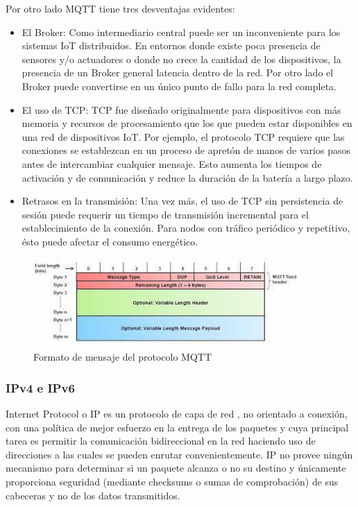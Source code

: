 Por otro lado MQTT tiene tres desventajas evidentes:
\begin{itemize}
\item El Broker: Como intermediario central puede ser un inconveniente para los sistemas IoT distribuidos. En entornos donde existe poca presencia de sensores y/o actuadores o donde no crece la cantidad de los dispositivos, la presencia de un Broker general latencia dentro de la red. Por otro lado el Broker puede convertirse en un único punto de fallo para la red completa.
\item El uso de TCP: TCP fue diseñado originalmente para dispositivos con más memoria y recursos de procesamiento que los que pueden estar disponibles en una red de dispositivos IoT. Por ejemplo, el protocolo TCP requiere que las conexiones se establezcan en un proceso de apretón de manos de varios pasos antes de intercambiar cualquier mensaje. Esto aumenta los tiempos de activación y de comunicación y reduce la duración de la batería a largo plazo.
\item Retrasos en la transmisión: Una vez más, el uso de TCP sin persistencia de sesión puede requerir un tiempo de transmisión incremental para el establecimiento de la conexión. Para nodos con tráfico periódico y repetitivo, ésto puede afectar el consumo energético.
\end{itemize}

\begin{figure}[ht]
\centering
\includegraphics[width=0.9\textwidth]{./Figuras/mqtt_header.jpeg}
\caption{\label{fig:mqttheader}Formato de mensaje del protocolo MQTT}
\vspace*{-10pt}
\end{figure}


\subsubsection{IPv4 e IPv6}
Internet Protocol o IP es un protocolo de capa de red , no orientado a conexión, con una política de mejor esfuerzo en la entrega de los paquetes y cuya principal tarea es permitir la comunicación bidireccional en la red haciendo uso de direcciones a las cuales se pueden enrutar convenientemente. IP no provee ningún mecanismo para determinar si un paquete alcanza o no su destino y únicamente proporciona seguridad (mediante checksums o sumas de comprobación) de sus cabeceras y no de los datos transmitidos. \\

